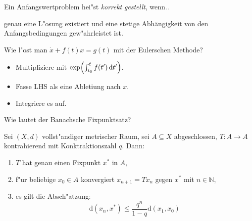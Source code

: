 \documentclass[9pt]{article}
\newenvironment{field}{}{\newpage}
\newif\ifnote
\newenvironment{note}{\notetrue}{\notefalse}
\newcommand{\localtag}{}
\newcommand{\globaltag}{}
\newcommand{\uuid}{}
\newcommand{\tags}[1]{
    \ifnote 
        \renewcommand{\localtag}{#1}
    \else
        \renewcommand{\globaltag}{#1}
    \fi 
    }
\newcommand{\xplain}[1]{\renewcommand{\uuid}{#1}}
\begin{document}
\begin{note}
	\xplain{caa48b6b-bfe0-4009-8d36-da9a13f48910}  %
	\tags{definition, 3.1.3}
	
	\begin{field}  %
		Ein Anfangswertproblem  hei"st \textit{korrekt gestellt}, wenn..
	\end{field}  
	
	\begin{field}  %
		genau eine L"osung existiert und eine stetige Abhängigkeit von den Anfangsbedingungen gew"ahrleistet ist. 
	\end{field}
\end{note}

\begin{note}
	\xplain{e7470fcc-afc7-4b91-a141-8e0d5c7677f8}  %
	\tags{GDGL, methode, 3.2.7.1}
	
	\begin{field}  %
		Wie l"ost man $\dot{x} + f(t)x = g(t)$ mit der Eulerschen Methode? 
	\end{field}  
	
	\begin{field}  %
		\begin{itemize}
			\item Multipliziere mit $\exp(\int_{t_0}^{t}f(t') \dif t')$.
			\item Fasse LHS als eine Abletiung nach $x$.
			\item Integriere es auf.
		\end{itemize}
	\end{field}
\end{note}

\begin{note}
	\xplain{512aa0ca-bf37-44a1-a507-4a2c51a90f65}  %
	\tags{satz, 3.3 , fixpunkt}
	
	\begin{field}  %
		Wie lautet der Banachsche Fixpunktsatz?
	\end{field}  
	
	\begin{field}  %
		Sei $(X,d)$ vollst"andiger metrischer Raum, sei $A \subseteq X$ abgeschlossen,
		$T: A \rightarrow A$ kontrahierend mit Konktraktionszahl $q$. Dann:
		\begin{enumerate}
			\item $T$ hat genau einen Fixpunkt $x^*$ in $A$,
			\item f"ur beliebige $x_0 \in A$ konvergiert $x_{n+1} = T{x_n}$ gegen $x^*$ mit $n \in \mathbb{N}$,
			\item es gilt die Absch"atzung:
			\begin{equation*}
				\mathrm{d} (x_n,x^*) \leq \frac{q^n}{1-q}\mathrm{d}(x_1,x_0)
			\end{equation*} 
		\end{enumerate}
	\end{field}
\end{note}
\end{document}
